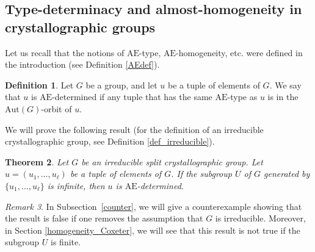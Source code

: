\documentclass[a4paper, 11pt]{amsart}
\newtheorem{te}{Theorem}[section]
\newtheorem{co}[te]{Corollary}
\theoremstyle{definition}
\newtheorem{de}[te]{Definition}
\theoremstyle{remark}
\newtheorem{rk}[te]{Remark}
\renewcommand{\geq}{\geqslant}
\begin{document}
\subsection{Type-determinacy and almost-homogeneity in crystallographic groups}\label{type-determinacy}

	Let us recall that the notions of $\mathrm{AE}$-type, $\mathrm{AE}$-homogeneity, etc. were defined in the introduction (see Definition \ref{AEdef}).

\begin{de}\label{type-det}Let $G$ be a group, and let $u$ be a tuple of elements of $G$. We say that $u$ is $\mathrm{AE}$-determined if any tuple that has the same $\mathrm{AE}$-type as $u$ is in the $\mathrm{Aut}(G)$-orbit of $u$.
\end{de}

We will prove the following result (for the definition of an irreducible crystallographic group, see Definition \ref{def_irreducible}). 

\begin{te}\label{main_crystallo0}
Let $G$ be an irreducible split crystallographic group. Let $u=(u_1,\ldots,u_{\ell})$ be a tuple of elements of $G$. If the subgroup $U$ of $G$ generated by $\lbrace u_1,\ldots,u_{\ell}\rbrace$ is infinite, then $u$ is $\mathrm{AE}$-determined.
\end{te}

\begin{rk}
In Subsection~\ref{counter}, we will give a counterexample showing that the result is false if one removes the assumption that $G$ is irreducible. Moreover, in Section \ref{homogeneity_Coxeter}, we will see that this result is not true if the subgroup $U$ is finite.
\end{rk}



\end{document}
